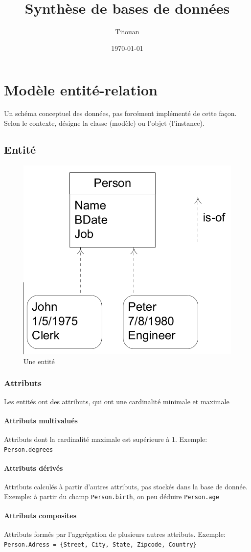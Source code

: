 \documentclass[a4paper]{article}
\author{Titouan \bsc{Christophe}}
\title{Synthèse de bases de données}
\date{\today}
\begin{document}
\maketitle
\tableofcontents

\section{Modèle entité-relation}
Un schéma conceptuel des données, pas forcément implémenté de cette façon.
Selon le contexte, désigne la classe (modèle) ou l'objet (l'instance).

\subsection{Entité}
\begin{figure}[h!]
    \center
    \includegraphics[width=.3\textwidth]{fig/entity.png}
    \caption{Une entité}
\end{figure}

\subsubsection{Attributs}
Les entités ont des attributs, qui ont une cardinalité minimale et maximale

\paragraph{Attributs multivalués}
Attributs dont la cardinalité maximale est supérieure à 1.
Exemple: \texttt{Person.degrees}

\paragraph{Attributs dérivés}
Attributs calculés à partir d'autres attributs, pas stockés dans la base de donnée.
Exemple: à partir du champ \texttt{Person.birth}, on peu déduire \texttt{Person.age}

\paragraph{Attributs composites}
Attributs formés par l'aggrégation de plusieurs autres attributs.
Exemple: \texttt{Person.Adress = \{Street, City, State, Zipcode, Country\}}
\end{document}
